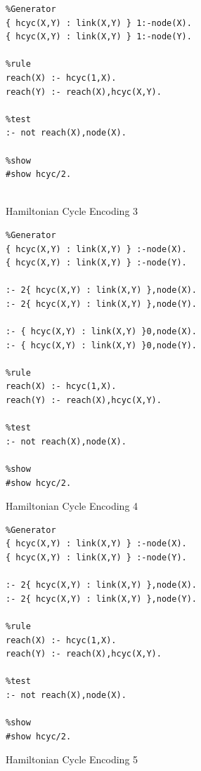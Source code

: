 \documentclass{new_tlp}
\begin{document}
\begin{figure}[!h]
\figrule
\begin{center}
\begin{verbatim}
%Generator
{ hcyc(X,Y) : link(X,Y) } 1:-node(X).
{ hcyc(X,Y) : link(X,Y) } 1:-node(Y).

%rule
reach(X) :- hcyc(1,X).
reach(Y) :- reach(X),hcyc(X,Y).

%test
:- not reach(X),node(X).

%show
#show hcyc/2.


\end{verbatim}
\end{center}
\figrule
\caption{Hamiltonian Cycle Encoding 3}\label{enc3}
\end{figure}

\begin{figure}[!h]
\figrule
\begin{center}
\begin{verbatim}
%Generator
{ hcyc(X,Y) : link(X,Y) } :-node(X).
{ hcyc(X,Y) : link(X,Y) } :-node(Y).

:- 2{ hcyc(X,Y) : link(X,Y) },node(X).
:- 2{ hcyc(X,Y) : link(X,Y) },node(Y).

:- { hcyc(X,Y) : link(X,Y) }0,node(X).
:- { hcyc(X,Y) : link(X,Y) }0,node(Y).

%rule
reach(X) :- hcyc(1,X).
reach(Y) :- reach(X),hcyc(X,Y).

%test
:- not reach(X),node(X).

%show
#show hcyc/2.

\end{verbatim}
\end{center}
\figrule
\caption{Hamiltonian Cycle Encoding 4}\label{enc4}
\end{figure}

\begin{figure}[!h]
\figrule
\begin{center}
\begin{verbatim}
%Generator
{ hcyc(X,Y) : link(X,Y) } :-node(X).
{ hcyc(X,Y) : link(X,Y) } :-node(Y).

:- 2{ hcyc(X,Y) : link(X,Y) },node(X).
:- 2{ hcyc(X,Y) : link(X,Y) },node(Y).

%rule
reach(X) :- hcyc(1,X).
reach(Y) :- reach(X),hcyc(X,Y).

%test
:- not reach(X),node(X).

%show
#show hcyc/2.
\end{verbatim}
\end{center}
\figrule
\caption{Hamiltonian Cycle Encoding 5}\label{enc5}
\end{figure}
\end{document}
